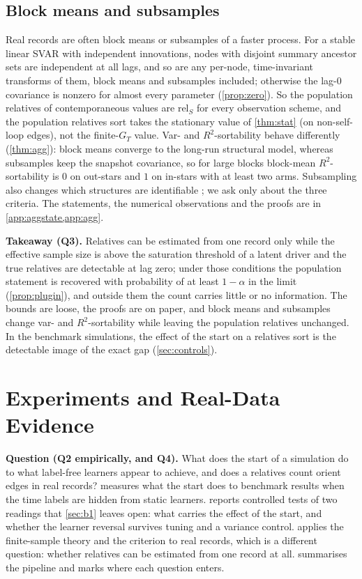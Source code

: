 \documentclass[pdflatex,sn-apa]{sn-jnl}
\theoremstyle{thmstyleone}
\theoremstyle{thmstylethree}
\theoremstyle{thmstyletwo}
\newcommand{\GT}{G_T}
\newcommand{\rel}{\mathrm{rel}}
\begin{document}
\subsection{Block means and subsamples}
\label{sec:agg}

Real records are often block means or subsamples of a faster process. For a
stable linear SVAR with independent innovations, nodes with disjoint summary
ancestor sets are independent at all lags, and so are any per-node,
time-invariant transforms of them, block means and subsamples included;
otherwise the lag-0 covariance is nonzero for almost every parameter
(\cref{prop:zero}). So the population relatives of contemporaneous values are
$\rel_S$ for every observation scheme, and the population relatives sort takes
the stationary value of \cref{thm:stat} (on non-self-loop edges), not the
finite-$\GT$ value. Var- and $R^2$-sortability behave differently
(\cref{thm:agg}): block means converge to the long-run structural model, whereas
subsamples keep the snapshot covariance, so for large blocks block-mean
$R^2$-sortability is $0$ on out-stars and $1$ on in-stars with at least two
arms. Subsampling also changes which structures are identifiable
\citep{gong2015subsampled,hyttinen2016subsampled}; we ask only about the three
criteria. The statements, the numerical observations and the proofs are in
\cref{app:aggstate,app:agg}.

\textbf{Takeaway (Q3).} Relatives can be estimated from one record only while
the effective sample size is above the saturation threshold of a latent driver
and the true relatives are detectable at lag zero; under those conditions the
population statement is recovered with probability of at least $1-\alpha$ in the
limit (\cref{prop:plugin}), and outside them the count carries little or no
information. The bounds are loose,
the proofs are on paper, and block means and subsamples change var- and
$R^2$-sortability while leaving the population relatives unchanged. In the
benchmark simulations, the effect of the start on a relatives sort is the
detectable image of the exact gap (\cref{sec:controls}).

\section{Experiments and Real-Data Evidence}
\label{sec:experiments}

\textbf{Question (Q2 empirically, and Q4).} What does the start of a simulation
do to what label-free learners appear to achieve, and does a relatives count
orient edges in real records?  measures what the start does to
benchmark results when the time labels are hidden from static learners.
 reports controlled tests of two readings that
\cref{sec:b1} leaves open: what carries the effect of the start, and whether the
learner reversal survives tuning and a variance control.
 applies the finite-sample theory and the criterion to real
records, which is a different question: whether relatives can be estimated from
one record at all.  summarises the pipeline and marks where each question enters.
\end{document}

